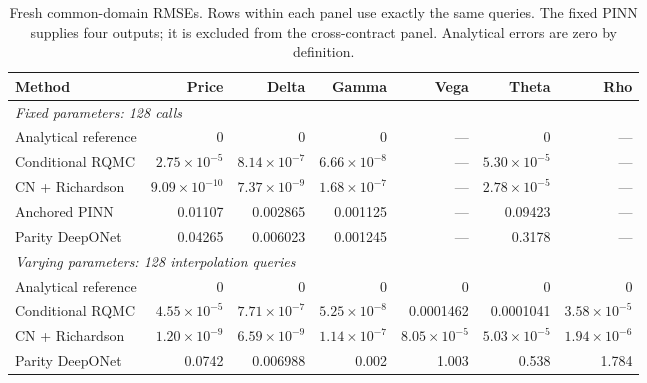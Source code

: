 \begin{table}[!ht]\centering\small\setlength{\tabcolsep}{3pt}
\caption{Fresh common-domain RMSEs. Rows within each panel use exactly the same queries. The fixed PINN supplies four outputs; it is excluded from the cross-contract panel. Analytical errors are zero by definition.}
\label{tab:fresh-shared}
\begin{tabular}{lrrrrrr}\toprule
Method & Price & Delta & Gamma & Vega & Theta & Rho\\
\midrule\multicolumn{7}{l}{\textit{Fixed parameters: 128 calls}}\\
Analytical reference & 0 & 0 & 0 & --- & 0 & ---\\
Conditional RQMC & $2.75\times10^{-5}$ & $8.14\times10^{-7}$ & $6.66\times10^{-8}$ & --- & $5.30\times10^{-5}$ & ---\\
CN + Richardson & $9.09\times10^{-10}$ & $7.37\times10^{-9}$ & $1.68\times10^{-7}$ & --- & $2.78\times10^{-5}$ & ---\\
Anchored PINN & 0.01107 & 0.002865 & 0.001125 & --- & 0.09423 & ---\\
Parity DeepONet & 0.04265 & 0.006023 & 0.001245 & --- & 0.3178 & ---\\
\midrule\multicolumn{7}{l}{\textit{Varying parameters: 128 interpolation queries}}\\
Analytical reference & 0 & 0 & 0 & 0 & 0 & 0\\
Conditional RQMC & $4.55\times10^{-5}$ & $7.71\times10^{-7}$ & $5.25\times10^{-8}$ & 0.0001462 & 0.0001041 & $3.58\times10^{-5}$\\
CN + Richardson & $1.20\times10^{-9}$ & $6.59\times10^{-9}$ & $1.14\times10^{-7}$ & $8.05\times10^{-5}$ & $5.03\times10^{-5}$ & $1.94\times10^{-6}$\\
Parity DeepONet & 0.0742 & 0.006988 & 0.002 & 1.003 & 0.538 & 1.784\\
\bottomrule\end{tabular}\end{table}
